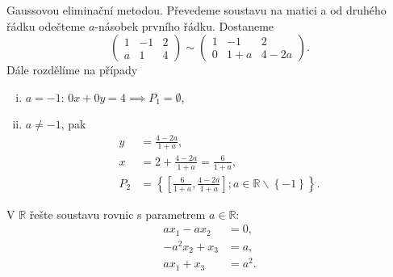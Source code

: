 \begin{reseni}
	Gaussovou eliminační metodou. Převedeme soustavu na matici a od druhého řádku odečteme $a$-násobek prvního řádku. Dostaneme
	$$\left(\begin{array}{cc|c}
		1 &-1&2\\
		a & 1& 4
	\end{array}\right)\sim
	\left(\begin{array}{cc|c}
		1 &-1&2\\
		0 & 1+a& 4 -2a
	\end{array}\right).$$
	Dále rozdělíme na případy
	\begin{enumerate}[i.]
		\item $a = -1$: $0x + 0y = 4 \implies P_1 = \emptyset$,
		\item $a \neq -1$, pak
		\begin{align*}
		y &= \frac{4-2a}{1+a}, \\
		x &= 2+ \frac{4-2a}{1+a} = \frac{6}{1+a}, \\
		P_2 &= \left\{\left[\frac{6}{1+a}, \frac{4-2a}{1+a}\right]; a \in \mathbb R \smallsetminus \left \{ -1 \right \} \right \}.
		\end{align*}
	\end{enumerate}
\end{reseni}

\begin{priklad}\label{matpar}
V $\mathbb R$ řešte soustavu rovnic s parametrem $a\in \mathbb R$:
\begin{align*}
    ax_1-ax_2 &=0,\\
    -a^2x_2+x_3 &=a,\\
    ax_1 + x_3 &= a^2.
\end{align*}
\end{priklad}

